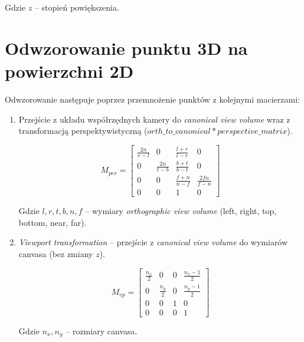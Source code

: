\documentclass{article}
\begin{document}
        Gdzie \(z\) -- stopień powiększenia.

\newpage

\section{Odwzorowanie punktu 3D na powierzchni 2D}

    Odwzorowanie następuje poprzez przemnożenie punktów z kolejnymi macierzami:

    \begin{enumerate}

        \item Przejście z układu współrzędnych kamery do \textit{canonical view volume} wraz 
        z transformacją perspektywistyczną (\(orth\_to\_canonical * perspective\_matrix\)).

        \begin{equation}
            M_{per}=
            \begin{bmatrix}
                \frac{2n}{r-l} & 0 & \frac{l+r}{l-r} & 0 \\
                0 & \frac{2n}{t-b} & \frac{b+t}{b-t} & 0 \\
                0 & 0 & \frac{f+n}{n-f} & \frac{2fn}{f-n} \\
                0 & 0 & 1 & 0
            \end{bmatrix}
        \end{equation}

        Gdzie \(l, r, t, b, n, f\) -- wymiary \textit{orthographic view volume} (left, right,
        top, bottom, near, far).

        \item \textit{Viewport transformation} -- przejście z \textit{canonical view volume}
        do wymiarów canvasa (bez zmiany \(z\)).

        \begin{equation}
            M_{vp}=
            \begin{bmatrix}
                \frac{n_x}{2} & 0 & 0 & \frac{n_x-1}{2} \\
                0 & \frac{n_y}{2} & 0 & \frac{n_y-1}{2} \\
                0 & 0 & 1 & 0 \\
                0 & 0 & 0 & 1
            \end{bmatrix}
        \end{equation}

        Gdzie \(n_x, n_y\) -- rozmiary canvasa.

    \end{enumerate}
\end{document}

